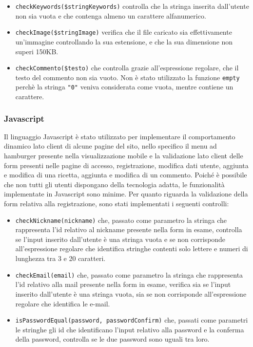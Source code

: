 \begin{itemize}
	\item \texttt{checkKeywords(\$stringKeywords)} controlla che la stringa inserita dall'utente non sia vuota e che contenga almeno un carattere alfanumerico.
	\item \texttt{checkImage(\$stringImage)} verifica che il file caricato sia effettivamente un'immagine controllando la sua estensione, e che la sua dimensione non superi 150KB.
	\item \texttt{checkCommento(\$testo)} che controlla grazie all'espressione regolare, che il testo del commento non sia vuoto. Non è stato utilizzato la funzione \texttt{empty} perchè la stringa \texttt{"0"} veniva considerata come vuota, mentre contiene un carattere.
\end{itemize}

\subsubsection{Javascript}\label{subs:javascript}
Il linguaggio Javascript è stato utilizzato per implementare il comportamento dinamico lato client di alcune pagine del sito, nello specifico il menu ad hamburger presente nella visualizzazione mobile e la validazione lato client delle form presenti nelle pagine di accesso, registrazione, modifica dati utente, aggiunta e modifica di una ricetta, aggiunta e modifica di un commento.
Poiché è possibile che non tutti gli utenti dispongano della tecnologia adatta, le funzionalità implementate in Javascript sono minime. \newline
Per quanto riguarda la validazione della form relativa alla registrazione, sono stati implementati i seguenti controlli:
\begin{itemize}
	\item \texttt{checkNickname(nickname)} che, passato come parametro la stringa che rappresenta l'id relativo al nickname presente nella form in esame, controlla se l'input inserito dall'utente è una stringa vuota e se non corrisponde all'espressione regolare che identifica stringhe contenti solo lettere e numeri di lunghezza tra 3 e 20 caratteri.
	\item \texttt{checkEmail(email)} che, passato come parametro la stringa che rappresenta l'id relativo alla mail presente nella form in esame, verifica sia se l'input inserito dall'utente è una stringa vuota, sia se non corrisponde all'espressione regolare che identifica le e-mail.
	\item \texttt{isPasswordEqual(password, passwordConfirm)} che, passati come parametri le stringhe gli id che identificano l'input relativo alla password e la conferma della password, controlla se le due password sono uguali tra loro.
\end{itemize}
